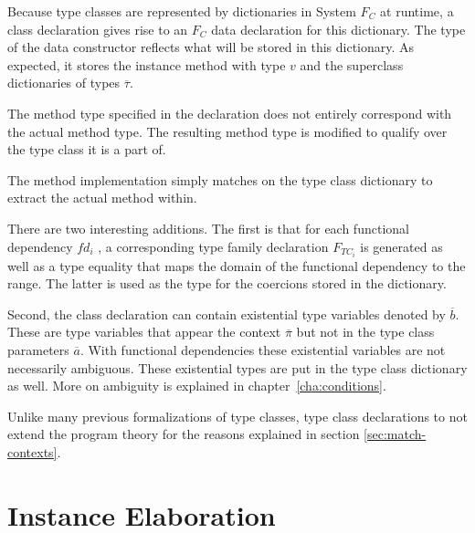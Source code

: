 Because type classes are represented by dictionaries in System $F_C$ at runtime,
a class declaration gives rise to an $F_C$ data declaration for this dictionary.
The type of the data constructor reflects what will be stored in this
dictionary. As expected, it stores the instance method with type $v$ and the
superclass dictionaries of types $\overline{\tau}$.

The method type specified in the declaration does not entirely correspond with
the actual method type. The resulting method type is modified to qualify over
the type class it is a part of.

The method implementation simply matches on the type class dictionary to extract
the actual method within.

There are two interesting additions. The first is that for each functional
dependency $fd_i$ , a corresponding type family declaration $F_{TC_i}$ is
generated as well as a type equality that maps the domain of the functional
dependency to the range. The latter is used as the type for the coercions stored
in the dictionary.

Second, the class declaration can contain existential type variables denoted by
$\overline{b}$. These are type variables that appear the context
$\overline{\pi}$ but not in the type class parameters $\overline{a}$. With
functional dependencies these existential variables are not necessarily
ambiguous. These existential types are put in the type class dictionary as well.
More on ambiguity is explained in chapter~\ref{cha:conditions}.

Unlike many previous formalizations of type classes, type class
declarations to not extend the program theory for the reasons explained in
section \ref{sec:match-contexts}.

\section{Instance Elaboration}
\label{sec:instance-elaboration}

